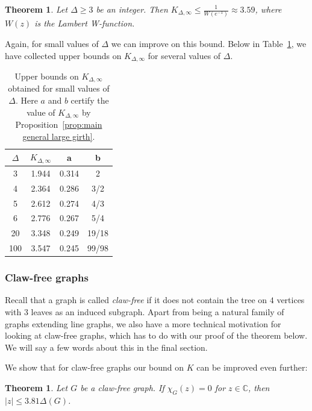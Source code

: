 \documentclass[a4paper,11pt,reqno]{amsart}
\newtheorem{theorem}[corollary]{Theorem}
\numberwithin{equation}{section}
\begin{document}
\begin{theorem}\label{thm:main large girth}
    Let $\Delta\ge 3$ be an integer. Then $K_{\Delta,\infty}\leq \tfrac{1}{W(e^{-1})}\approx 3.59$, where $W(z)$ is the Lambert W-function.
\end{theorem}
Again, for small values of $\Delta$ we can improve on this bound.
Below in Table~\ref{tab:main large girth}, we have collected upper bounds on $K_{\Delta,\infty}$ for several values of $
\Delta$.
\begin{table}[h]
    \centering
    \begin{tabular}{c|c|c|c}
        $\Delta$ & $K_{\Delta,\infty}$ & a & b \\
        \hline
        3  &  1.944  &  0.314  &  2 \\
        4  &  2.364  &  0.286  &  3/2\\
        5  &  2.612  &  0.274  &  4/3\\
        6  &  2.776  &  0.267  &  5/4 \\
        20  &  3.348  &  0.249  &  19/18 \\
        100  &  3.547  &  0.245  &  99/98
    \end{tabular}
    \caption{Upper bounds on $K_{\Delta,\infty}$ obtained for small values of $\Delta$. Here $a$ and $b$ certify the value of $K_{\Delta,\infty}$ by Proposition~\ref{prop:main general large girth}.}
    \label{tab:main large girth}
\end{table}

\subsubsection*{Claw-free graphs}
Recall that a graph is called \emph{claw-free} if it does not contain the tree on $4$ vertices with $3$ leaves as an induced subgraph.
Apart from being a natural family of graphs extending line graphs, we also have a more technical motivation for looking at claw-free graphs, which has to do with our proof of the theorem below. We will say a few words about this in the final section.

We show that for claw-free graphs our bound on $K$ can be improved even further:

\begin{theorem}\label{thm:main CF}
Let $G$ be a claw-free graph. If $\chi_G(z)=0$ for $z\in \mathbb{C}$, then $|z|\leq 3.81 \Delta(G)$.
\end{theorem}

 
\end{document}
